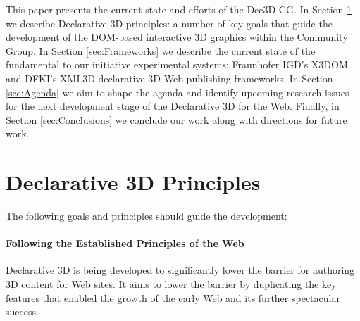 \documentclass[review]{acmsiggraph}
\begin{document}
This paper presents the current state and efforts of the Dec3D CG. In Section \ref{sec:Principles} we describe Declarative 3D principles: a number of key goals that guide the development of the DOM-based interactive 3D graphics within the Community Group.
In Section \ref{sec:Frameworks} we describe the current state of the fundamental to our initiative experimental systems: Fraunhofer IGD's X3DOM \cite{Behr2009} and DFKI's XML3D \cite{Sons2010} declarative 3D Web publishing frameworks.
In Section \ref{sec:Agenda} we aim to shape the agenda and identify upcoming research issues for the next development stage of the Declarative 3D for the Web. Finally, in Section \ref{sec:Conclusions} we conclude our work along with directions for future work.


\section{Declarative 3D Principles}
\label{sec:Principles}

The following goals and principles should guide the development:

\paragraph{Following the Established Principles of the Web}
Declarative 3D is being developed to significantly lower the barrier for authoring 3D content for Web sites. It aims to lower the barrier by duplicating the key features that enabled the growth of the early Web and its further spectacular success.
\end{document}
